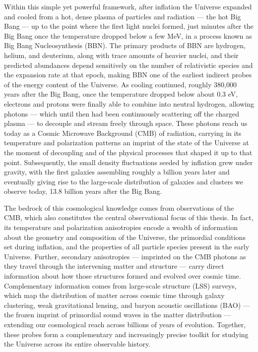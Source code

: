 Within this simple yet powerful framework, after inflation the Universe expanded and cooled from a hot, dense plasma of particles and radiation --- the hot Big Bang --- up to the point where the first light nuclei formed, just minutes after the Big Bang once the temperature dropped below a few MeV, in a process known as Big Bang Nucleosynthesis (BBN). The primary products of BBN are hydrogen, helium, and deuterium, along with trace amounts of heavier nuclei, and their predicted abundances depend sensitively on the number of relativistic species and the expansion rate at that epoch, making BBN one of the earliest indirect probes of the energy content of the Universe. As cooling continued, roughly 380,000 years after the Big Bang, once the temperature dropped below about $0.3$ eV, electrons and protons were finally able to combine into neutral hydrogen, allowing photons --- which until then had been continuously scattering off the charged plasma --- to decouple and stream freely through space. These photons reach us today as a Cosmic Microwave Background (CMB) of radiation, carrying in its temperature and polarization patterns an imprint of the state of the Universe at the moment of decoupling and of the physical processes that shaped it up to that point. Subsequently, the small density fluctuations seeded by inflation grew under gravity, with the first galaxies assembling roughly a billion years later and eventually giving rise to the large-scale distribution of galaxies and clusters we observe today, 13.8 billion years after the Big Bang.


The bedrock of this cosmological knowledge comes from observations of the CMB, which also constitutes the central observational focus of this thesis. In fact, its temperature and polarization anisotropies encode a wealth of information about the geometry and composition of the Universe, the primordial conditions set during inflation, and the properties of all particle species present in the early Universe. Further, secondary anisotropies --- imprinted on the CMB photons as they travel through the intervening matter and structure --- carry direct information about how those structures formed and evolved over cosmic time. Complementary information comes from large-scale structure (LSS) surveys, which map the distribution of matter across cosmic time through galaxy clustering, weak gravitational lensing, and baryon acoustic oscillations (BAO) --- the frozen imprint of primordial sound waves in the matter distribution --- extending our cosmological reach across billions of years of evolution. Together, these probes form a complementary and increasingly precise toolkit for studying the Universe across its entire observable history.

